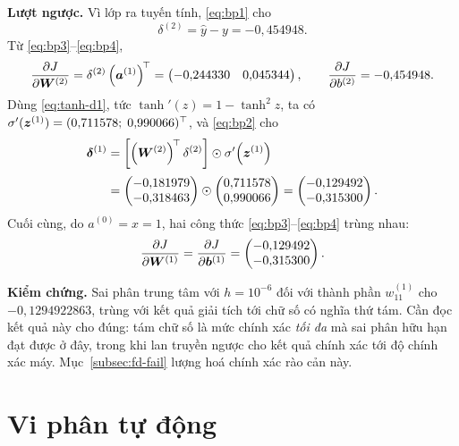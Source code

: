 \begin{vidu}
\noindent\textbf{Lượt ngược.} Vì lớp ra tuyến tính, \eqref{eq:bp1} cho
\[
\delta^{(2)} = \hat{y} - y = -0{,}454948 .
\]
Từ \eqref{eq:bp3}--\eqref{eq:bp4},
\[
\frac{\partial J}{\partial \bm{W}^{(2)}}
= \delta^{(2)} \left(\bm{a}^{(1)}\right)^{\!\top}
= \begin{pmatrix} -0{,}244330 & 0{,}045344 \end{pmatrix},
\qquad
\frac{\partial J}{\partial b^{(2)}} = -0{,}454948 .
\]
Dùng \eqref{eq:tanh-d1}, tức $\tanh'(z) = 1 - \tanh^2 z$, ta có
$\sigma'(\bm{z}^{(1)}) = (0{,}711578;\; 0{,}990066)^{\top}$, và \eqref{eq:bp2} cho
\[
\begin{aligned}
\bm{\delta}^{(1)}
&= \left[\left(\bm{W}^{(2)}\right)^{\!\top}\delta^{(2)}\right]
   \odot \sigma'\!\left(\bm{z}^{(1)}\right) \\[2pt]
&= \begin{pmatrix} -0{,}181979 \\ -0{,}318463 \end{pmatrix}
   \odot
   \begin{pmatrix} 0{,}711578 \\ 0{,}990066 \end{pmatrix}
 = \begin{pmatrix} -0{,}129492 \\ -0{,}315300 \end{pmatrix}.
\end{aligned}
\]
Cuối cùng, do $a^{(0)} = x = 1$, hai công thức
\eqref{eq:bp3}--\eqref{eq:bp4} trùng nhau:
\[
\frac{\partial J}{\partial \bm{W}^{(1)}}
= \frac{\partial J}{\partial \bm{b}^{(1)}}
= \begin{pmatrix} -0{,}129492 \\ -0{,}315300 \end{pmatrix}.
\]
 
\noindent\textbf{Kiểm chứng.} Sai phân trung tâm với $h = 10^{-6}$ đối với thành
phần $w^{(1)}_{11}$ cho $-0{,}1294922863$, trùng với kết quả giải tích tới chữ
số có nghĩa thứ tám. Cần đọc kết quả này cho đúng: tám chữ số là mức chính xác
\emph{tối đa} mà sai phân hữu hạn đạt được ở đây, trong khi lan truyền ngược cho
kết quả chính xác tới độ chính xác máy. Mục~\ref{subsec:fd-fail} lượng hoá chính
xác rào cản này.
\end{vidu}
 
\section{Vi phân tự động}
\label{sec:ad}
 
